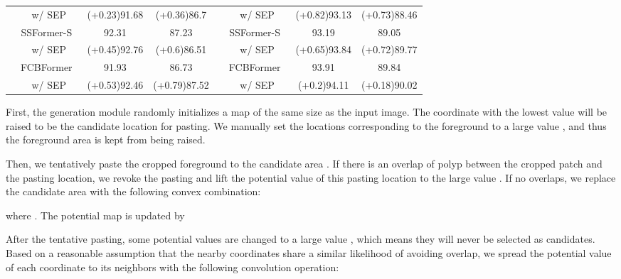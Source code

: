 \documentclass{article}
\begin{document}
\begin{table*}[tbp]
\begin{center}
\begin{tabular}{c|c|cc|c|c|cc}
                    & w/ SEP &\textcolor[rgb]{0,0,1}{(+0.23)}91.68&\textcolor[rgb]{0,0,1}{(+0.36)}86.7 && w/ SEP &\textcolor[rgb]{0,0,1}{(+0.82)}93.13&\textcolor[rgb]{0,0,1}{(+0.73)}88.46\\ 
                    \cline{2-4} \cline{6-8}
                    & SSFormer-S~\cite{ssformer}&92.31&87.23 & & SSFormer-S~\cite{ssformer}&93.19&89.05 \\
                    & w/ SEP &\textcolor[rgb]{0,0,1}{(+0.45)}92.76&\textcolor[rgb]{0,0,1}{(+0.6)}86.51 && w/ SEP &\textcolor[rgb]{0,0,1}{(+0.65)}93.84&\textcolor[rgb]{0,0,1}{(+0.72)}89.77\\ 
                     \cline{2-4} \cline{6-8}
\cline{2-4} \cline{6-8}
                    & FCBFormer~\cite{FCBFormer}&91.93&86.73 & & FCBFormer~\cite{FCBFormer}&93.91&89.84\\
                    & w/ SEP &\textcolor[rgb]{0,0,1}{(+0.53)}92.46&\textcolor[rgb]{0,0,1}{(+0.79)}87.52 & & w/ SEP &\textcolor[rgb]{0,0,1}{(+0.2)}94.11&\textcolor[rgb]{0,0,1}{(+0.18)}90.02\\ 
                    \hline\hline
\end{tabular}
\end{center}
\end{table*}

First, the generation module randomly initializes a map  of the same size as the input image. The coordinate  with the lowest value will be raised to be the candidate location for pasting. We manually set the locations corresponding to the foreground to a large value , and thus the foreground area is kept from being raised.

Then, we tentatively paste the cropped foreground to the candidate area . If there is an overlap of polyp between the cropped patch and the pasting location, we revoke the pasting and lift the potential value of this pasting location to the large value .  If no overlaps, we replace the candidate area with the following convex combination:



\noindent
where . The potential map is updated by 



After the tentative pasting, some potential values are changed to a large value , which means they will never be selected as candidates. Based on a reasonable assumption that the nearby coordinates share a similar likelihood of avoiding overlap, we spread the potential value of each coordinate to its neighbors with the following convolution operation:
\end{document}
